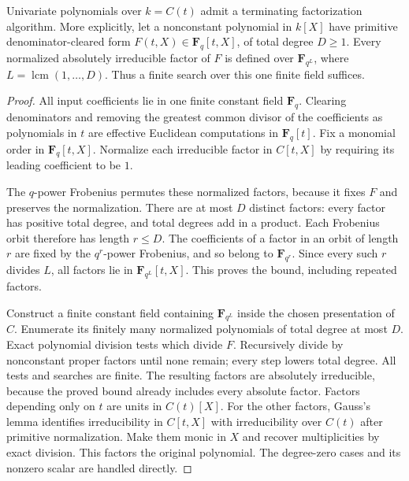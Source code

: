 \begin{proposition}
\label{C:function-field-constant-bound}
Univariate polynomials over $k=C(t)$ admit a terminating
factorization algorithm. More explicitly, let a nonconstant
polynomial in $k[X]$ have primitive denominator-cleared form
$F(t,X)\in\mathbf F_q[t,X]$, of total degree $D\geq1$.
Every normalized absolutely irreducible factor of $F$ is defined
over $\mathbf F_{q^L}$, where
$L=\operatorname{lcm}(1,\ldots,D)$.
Thus a finite search over this one finite field suffices.
\end{proposition}
\begin{proof}
All input coefficients lie in one finite constant field
$\mathbf F_q$. Clearing denominators and removing the greatest
common divisor of the coefficients as polynomials in $t$
are effective Euclidean computations in $\mathbf F_q[t]$.
Fix a monomial order in $\mathbf F_q[t,X]$. Normalize each
irreducible factor in $C[t,X]$ by requiring its leading
coefficient to be $1$.

The $q$-power Frobenius permutes these normalized factors,
because it fixes $F$ and preserves the normalization.
There are at most $D$ distinct factors: every factor has
positive total degree, and total degrees add in a product.
Each Frobenius orbit therefore has length $r\leq D$.
The coefficients of a factor in an orbit of length $r$
are fixed by the $q^r$-power Frobenius, and so belong to
$\mathbf F_{q^r}$. Since every such $r$ divides $L$,
all factors lie in $\mathbf F_{q^L}[t,X]$.
This proves the bound, including repeated factors.

Construct a finite constant field containing $\mathbf F_{q^L}$
inside the chosen presentation of $C$. Enumerate its finitely
many normalized polynomials of total degree at most $D$.
Exact polynomial division tests which divide $F$.
Recursively divide by nonconstant proper factors until none
remain; every step lowers total degree. All tests and searches
are finite. The resulting factors are absolutely irreducible,
because the proved bound already includes every absolute factor.
Factors depending only on $t$ are units in $C(t)[X]$.
For the other factors, Gauss's lemma identifies irreducibility
in $C[t,X]$ with irreducibility over $C(t)$ after primitive
normalization. Make them monic in $X$ and recover multiplicities
by exact division. This factors the original polynomial.
The degree-zero cases and its nonzero scalar are handled directly.
\end{proof}

